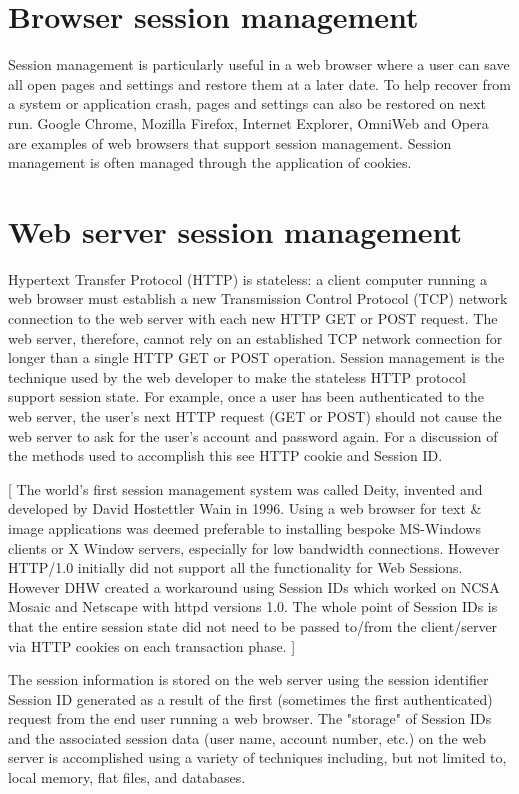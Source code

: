\section{Browser session management}

Session management is particularly useful in a web browser where a user can save all open pages and settings and restore them at a later date. To help recover from a system or application crash, pages and settings can also be restored on next run. Google Chrome, Mozilla Firefox, Internet Explorer, OmniWeb and Opera are examples of web browsers that support session management. Session management is often managed through the application of cookies.





\section{Web server session management}

Hypertext Transfer Protocol (HTTP) is stateless: a client computer running a web browser must establish a new Transmission Control Protocol (TCP) network connection to the web server with each new HTTP GET or POST request. The web server, therefore, cannot rely on an established TCP network connection for longer than a single HTTP GET or POST operation. Session management is the technique used by the web developer to make the stateless HTTP protocol support session state. For example, once a user has been authenticated to the web server, the user's next HTTP request (GET or POST) should not cause the web server to ask for the user's account and password again. For a discussion of the methods used to accomplish this see HTTP cookie and Session ID.

[ The world's first session management system was called Deity, invented and developed by David Hostettler Wain in 1996. Using a web browser for text \& image applications was deemed preferable to installing bespoke MS-Windows clients or X Window servers, especially for low bandwidth connections. However HTTP/1.0 initially did not support all the functionality for Web Sessions. However DHW created a workaround using Session IDs which worked on NCSA Mosaic and Netscape with httpd versions 1.0. The whole point of Session IDs is that the entire session state did not need to be passed to/from the client/server via HTTP cookies on each transaction phase. ]

The session information is stored on the web server using the session identifier Session ID generated as a result of the first (sometimes the first authenticated) request from the end user running a web browser. The "storage" of Session IDs and the associated session data (user name, account number, etc.) on the web server is accomplished using a variety of techniques including, but not limited to, local memory, flat files, and databases.

